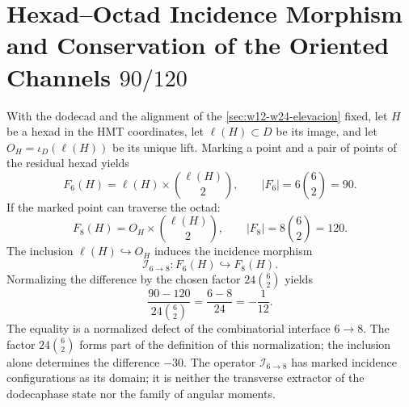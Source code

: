 \section{Hexad--Octad Incidence Morphism and Conservation of the Oriented Channels \(90/120\)}

With the dodecad and the alignment of the
\cref{sec:w12-w24-elevacion} fixed, let \(H\) be a hexad in the HMT coordinates,
let \(\ell(H)\subset D\) be its image, and let
\(O_H=\iota_D(\ell(H))\) be its unique lift. Marking a point
and a pair of points of the residual hexad yields
\[
F_6(H)=\ell(H)\times\binom{\ell(H)}2,
\qquad
|F_6|=6\binom62=90.
\]
If the marked point can traverse the octad:
\[
F_8(H)=O_H\times\binom{\ell(H)}2,
\qquad
|F_8|=8\binom62=120.
\]
The inclusion \(\ell(H)\hookrightarrow O_H\) induces the incidence morphism
\[
 \mathcal I_{6\to8}:F_6(H)\hookrightarrow F_8(H).
\]
Normalizing the difference by the chosen
factor \(24\binom62\) yields
\[
\boxed{
\frac{90-120}{24\binom62}
=\frac{6-8}{24}
=-\frac1{12}.}
\]
The equality is a normalized defect of the combinatorial interface \(6\to8\). The factor \(24\binom62\) forms part of the definition of this normalization; the inclusion alone determines the difference \(-30\). The operator \(\mathcal I_{6\to8}\) has marked incidence configurations as its domain; it is neither the transverse extractor of the dodecaphase state nor the family of angular moments.
